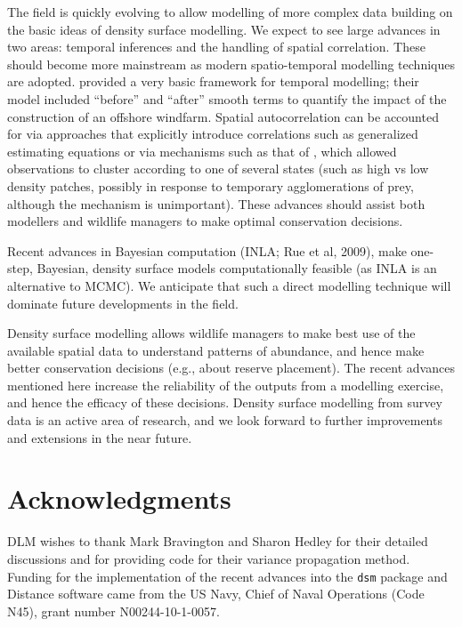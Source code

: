 \documentclass[a4paper,12pt]{article}
\begin{document}
The field is quickly evolving to allow modelling of more complex data building on the basic ideas of density surface modelling. We expect to see large advances in two areas: temporal inferences and the handling of spatial correlation. These should become more mainstream as modern spatio-temporal modelling techniques are adopted. \cite{Petersen:2011vy} provided a very basic framework for temporal modelling; their model included ``before'' and ``after'' smooth terms to quantify the impact of the construction of an offshore windfarm. Spatial autocorrelation can be accounted for via approaches that explicitly introduce correlations such as generalized estimating equations \cite[GEEs;][]{Hardin:2003uf} or via mechanisms such as that of \cite{Skaug:2006gs},  which allowed observations to cluster according to one of several states (such as high vs low density patches, possibly in response to temporary agglomerations of prey, although the mechanism is unimportant). These advances should assist both modellers and wildlife managers to make optimal conservation decisions. 

Recent advances in Bayesian computation (INLA; Rue et al, 2009), make one-step, Bayesian, density surface models computationally feasible (as INLA is an alternative to MCMC). We anticipate that such a direct modelling technique will dominate future developments in the field.

Density surface modelling allows wildlife managers to make best use of the available spatial data to understand patterns of abundance, and hence make better conservation decisions (e.g., about reserve placement). The recent advances mentioned here increase the reliability of the outputs from a modelling exercise, and hence the efficacy of these decisions.  Density surface modelling from survey data is an active area of research, and we look forward to further improvements and extensions in the near future.

\section*{Acknowledgments}

DLM wishes to thank Mark Bravington and Sharon Hedley for their detailed discussions and for providing code for their variance propagation method. Funding for the implementation of the recent advances into the \texttt{dsm} package and Distance software came from the US Navy, Chief of Naval Operations (Code N45), grant number N00244-10-1-0057.
\end{document}
